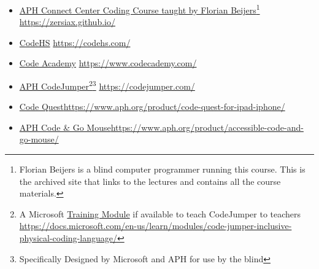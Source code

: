 \begin{itemize}[leftmargin=*]
\item \href{https://zersiax.github.io/}{APH Connect Center Coding Course taught by Florian Beijers}\footnote{\raggedright Florian Beijers is a blind computer programmer running this course. This is the archived site that links to the lectures and contains all the course materials.} \url{https://zersiax.github.io/}
\item \href{https://codehs.com/}{CodeHS} \break\url{https://codehs.com/}
\item \href{https://www.codecademy.com/}{Code Academy} \break\url{https://www.codecademy.com/}
\item \href{https://codejumper.com/}{APH CodeJumper}\footnote{\raggedright A Microsoft \href{https://docs.microsoft.com/en-us/learn/modules/code-jumper-inclusive-physical-coding-language/}{Training Module} if available to teach CodeJumper to teachers \break\url{https://docs.microsoft.com/en-us/learn/modules/code-jumper-inclusive-physical-coding-language/}}\fnsep\footnote{\raggedright Specifically Designed by Microsoft and APH for use by the blind} \break\url{https://codejumper.com/}
\item \href{https://www.aph.org/product/code-quest-for-ipad-iphone/}{Code Quest}\footnotemark[\value{footnote}] \break\url{https://www.aph.org/product/code-quest-for-ipad-iphone/}
\item \href{https://www.aph.org/product/accessible-code-and-go-mouse/}{APH Code \& Go Mouse}\footnotemark[\value{footnote}] \break\url{https://www.aph.org/product/accessible-code-and-go-mouse/}
\end{itemize}